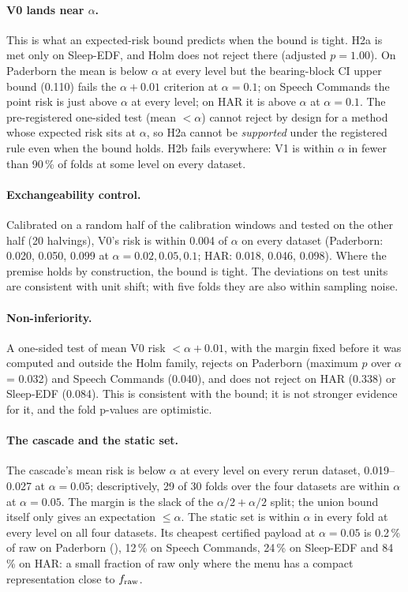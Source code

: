 \paragraph{V0 lands near $\alpha$.} This is what an expected-risk bound predicts when the bound is
tight. H2a is met only on Sleep-EDF, and Holm does not reject there (adjusted $p = 1.00$). On
Paderborn the mean is below $\alpha$ at every level but the bearing-block CI upper bound (0.110)
fails the $\alpha+0.01$ criterion at $\alpha = 0.1$; on Speech Commands the point risk is just above $\alpha$ at every level; on HAR
it is above $\alpha$ at $\alpha = 0.1$. The pre-registered one-sided test (mean $< \alpha$) cannot
reject by design for a method whose expected risk sits at $\alpha$, so H2a cannot be
\emph{supported} under the registered rule even when the bound holds. H2b fails everywhere: V1 is
within $\alpha$ in fewer than 90\,\% of folds at some level on every dataset.

\paragraph{Exchangeability control.} Calibrated on a random half of the calibration windows and
tested on the other half (20 halvings), V0's risk is within 0.004 of $\alpha$ on every dataset
(Paderborn: 0.020, 0.050, 0.099 at $\alpha = 0.02, 0.05, 0.1$; HAR: 0.018, 0.046, 0.098). Where
the premise holds by construction, the bound is tight. The deviations on test units are consistent
with unit shift; with five folds they are also within sampling noise.

\paragraph{Non-inferiority\expl.} A one-sided test of mean V0 risk $< \alpha + 0.01$, with the
margin fixed before it was computed and outside the Holm family, rejects on Paderborn (maximum $p$
over $\alpha$ = 0.032) and Speech Commands (0.040), and does not reject on HAR (0.338) or Sleep-EDF
(0.084). This is consistent with the bound; it is not stronger evidence for it, and the fold
p-values are optimistic.

\paragraph{The cascade and the static set\expl.} The cascade's mean risk is below $\alpha$ at every
level on every rerun dataset, 0.019--0.027 at $\alpha = 0.05$; descriptively, 29 of 30 folds over
the four datasets are within $\alpha$ at $\alpha = 0.05$. The margin is the slack of the
$\alpha/2 + \alpha/2$ split; the union bound itself only gives an expectation $\le\alpha$. The
static set is within $\alpha$ in every fold at every level on all four datasets. Its cheapest
certified payload at $\alpha = 0.05$ is 0.2\,\% of raw on Paderborn (), 12\,\% on Speech
Commands, 24\,\% on Sleep-EDF and 84\,\% on HAR: a small fraction of raw only where the menu has a
compact representation close to $f_{\mathrm{raw}}$.

